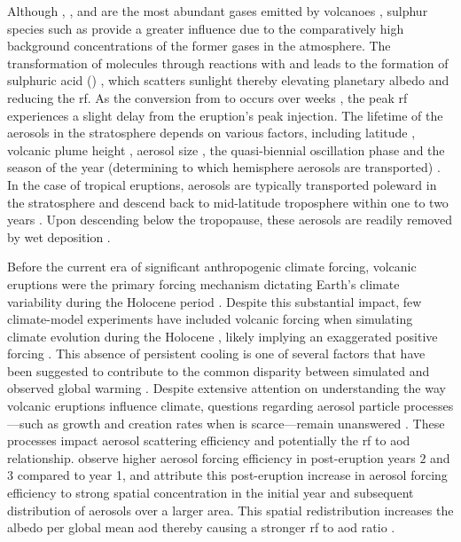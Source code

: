 \documentclass{ametsocV6.1}
\begin{document}
Although , , and  are the most abundant gases emitted by
volcanoes \citep{robock2000}, sulphur species such as  provide a greater
influence due to the comparatively high background concentrations of the former gases in
the atmosphere. The transformation of  molecules through reactions with 
and  leads to the formation of sulphuric acid () \citep{robock2000},
which scatters sunlight thereby elevating planetary albedo and reducing the \gls{rf}. As
the conversion from  to  occurs over weeks \citep{robock2000}, the
peak \gls{rf} experiences a slight delay from the eruption's peak  injection.
The lifetime of the  aerosols in the stratosphere depends on various factors,
including latitude \citep{marshall2019, toohey2019}, volcanic plume height
\citep{marshall2019}, aerosol size \citep{marshall2019}, the quasi-biennial oscillation
phase \citep{pitari2016b} and the season of the year (determining to which hemisphere
aerosols are transported) \citep{toohey2011,toohey2019}. In the case of tropical
eruptions, aerosols are typically transported poleward in the stratosphere and descend
back to mid-latitude troposphere within one to two years \citep{robock2000}. Upon
descending below the tropopause, these aerosols are readily removed by wet deposition
\citep{liu2012}.

Before the current era of significant anthropogenic climate forcing, volcanic eruptions
were the primary forcing mechanism dictating Earth's climate variability during the
Holocene period \citep{sigl2022}. Despite this substantial impact, few climate-model
experiments have included volcanic forcing when simulating climate evolution during the
Holocene \citep{sigl2022}, likely implying an exaggerated positive forcing
\citep{gregory2016,solomon2011}. This absence of persistent cooling is one of several
factors that have been suggested to contribute to the common disparity between simulated
and observed global warming \citep{andersson2015}. Despite extensive attention on
understanding the way volcanic eruptions influence climate, questions regarding aerosol
particle processes---such as growth and creation rates when  is scarce---remain
unanswered \citep[e.g.~][]{robock2000,zanchettin2019,marshall2020,marshall2022}. These
processes impact aerosol scattering efficiency and potentially the \gls{rf} to \gls{aod}
relationship. \citet{marshall2020} observe higher aerosol forcing efficiency in
post-eruption years \(2\) and \(3\) compared to year 1, and attribute this post-eruption
increase in aerosol forcing efficiency to strong spatial concentration in the initial
year and subsequent distribution of aerosols over a larger area. This spatial
redistribution increases the albedo per global mean \gls{aod} thereby causing a stronger
\gls{rf} to \gls{aod} ratio \citep{marshall2020}.
\end{document}
